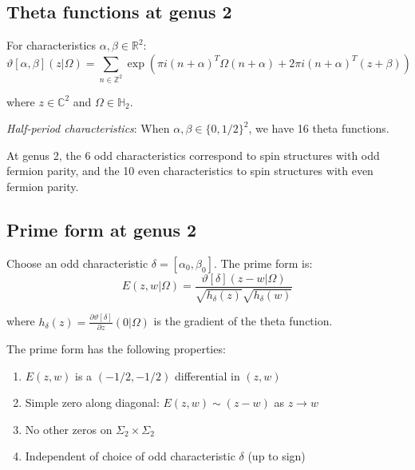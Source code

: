 \subsection{Theta functions at genus 2}

\begin{definition}
\label{def:theta-genus2}
For characteristics $\alpha, \beta \in \mathbb{R}^2$:
\begin{equation}
\vartheta[\alpha, \beta](z|\Omega) = \sum_{n \in \mathbb{Z}^2} \exp\left(\pi i (n+\alpha)^T \Omega (n+\alpha) 
+ 2\pi i (n+\alpha)^T (z+\beta)\right)
\end{equation}

where $z \in \mathbb{C}^2$ and $\Omega \in \mathbb{H}_2$.

\emph{Half-period characteristics}: When $\alpha, \beta \in \{0, 1/2\}^2$, we have 16 theta functions.
\end{definition}

\begin{theorem}
\label{thm:odd-even-g2}
At genus 2, the 6 odd characteristics correspond to spin structures with odd fermion parity, and the 10 even characteristics to spin structures with even fermion parity.
\end{theorem}

\subsection{Prime form at genus 2}

\begin{definition}[Prime form \texorpdfstring{$E(z,w)$}{E(z,w)} for \texorpdfstring{$g=2$}{g=2}]
\label{def:prime-form-g2}
Choose an odd characteristic $\delta = [\alpha_0, \beta_0]$. The prime form is:
\begin{equation}
E(z,w|\Omega) = \frac{\vartheta[\delta](z-w|\Omega)}{\sqrt{h_\delta(z)} \sqrt{h_\delta(w)}}
\end{equation}

where $h_\delta(z) = \frac{\partial \vartheta[\delta]}{\partial z}(0|\Omega)$ is the gradient of the theta function.

The prime form has the following properties:
\begin{enumerate}
\item $E(z,w)$ is a $(-1/2, -1/2)$ differential in $(z,w)$
\item Simple zero along diagonal: $E(z,w) \sim (z-w)$ as $z \to w$
\item No other zeros on $\Sigma_2 \times \Sigma_2$
\item Independent of choice of odd characteristic $\delta$ (up to sign)
\end{enumerate}
\end{definition}

